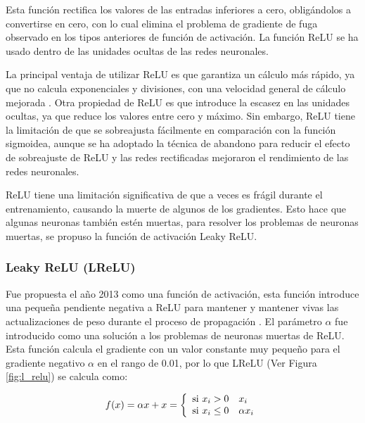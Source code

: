 Esta función rectifica los valores de las entradas inferiores a cero, obligándolos a convertirse en cero, con lo cual elimina el problema de gradiente de fuga observado en los tipos anteriores de función de activación. La función ReLU se ha usado dentro de las unidades ocultas de las redes neuronales.

\vspace{5mm} %

La principal ventaja de utilizar ReLU es que garantiza un cálculo más rápido, ya que no calcula exponenciales y divisiones, con una velocidad general de cálculo mejorada \cite{Reference45}. Otra propiedad de ReLU es que introduce la escasez en las unidades ocultas, ya que reduce los valores entre cero y máximo. Sin embargo, ReLU tiene la limitación de que se sobreajusta fácilmente en comparación con la función sigmoidea, aunque se ha adoptado la técnica de abandono para reducir el efecto de sobreajuste de ReLU y las redes rectificadas mejoraron el rendimiento de las redes neuronales.

\vspace{5mm} %

ReLU tiene una limitación significativa de que a veces es frágil durante el entrenamiento, causando la muerte de algunos de los gradientes. Esto hace que algunas neuronas también estén muertas, para resolver los problemas de neuronas muertas, se propuso la funci\'{o}n de activaci\'{o}n Leaky ReLU.

\subsubsection{Leaky ReLU (LReLU)}

Fue propuesta el a\~{n}o 2013 como una funci\'{o}n de activaci\'{o}n, esta funci\'{o}n introduce una peque\~{n}a pendiente negativa a ReLU para mantener y mantener vivas las actualizaciones de peso durante el proceso de propagaci\'{o}n \cite{Reference44}. El par\'{a}metro $\alpha$ fue introducido como una soluci\'{o}n a los problemas de neuronas muertas de ReLU. Esta funci\'{o}n calcula el gradiente con un valor constante muy peque\~{n}o para el gradiente negativo $\alpha$ en el rango de 0.01, por lo que LReLU (Ver Figura \ref{fig:l_relu}) se calcula como:

\begin{equation}
f(x) = \alpha x + x = \left\lbrace
\begin{array}{ll}
\textup{si } x_{i}>0 & x_{i}\\
\textup{si } x_{i} \leq 0 & \alpha x_{i}
\end{array}
\right.
\end{equation}

